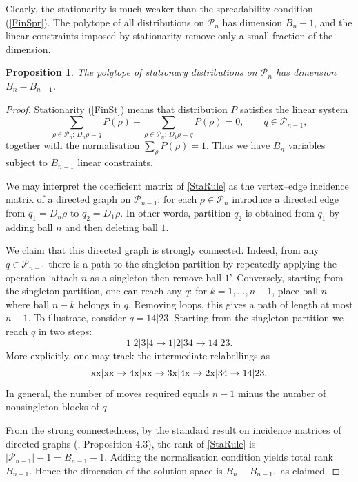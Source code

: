 \documentclass{article}
\newtheorem{proposition}{Proposition}
\begin{document}
Clearly, the stationarity is much weaker than the spreadability condition (\ref{FinSpr}).
The polytope of all distributions on $\mathcal P_n$ has dimension $B_n-1$, and the 
 linear constraints imposed by stationarity remove  only a small fraction of the dimension.



\begin{proposition}
The polytope of stationary distributions on $\mathcal P_n$ has dimension $B_n - B_{n-1}$.
\end{proposition}

\begin{proof}
Stationarity (\ref{FinSt}) means that  distribution $P$  satisfies the
linear system
\begin{equation}\label{StaRule}
\sum_{\rho\in \mathcal P_n:\,D_n \rho = q} P(\rho)
-
\sum_{\rho\in \mathcal P_n:\,D_1 \rho = q} P(\rho)
=0, 
\qquad q\in \mathcal P_{n-1},
\end{equation}
together with the normalisation $\sum_{\rho}P(\rho)=1$. Thus we have $B_n$ variables subject to $B_{n-1}$ linear constraints.

We may
interpret the coefficient matrix of \eqref{StaRule} as the vertex--edge incidence matrix of a directed graph on $\mathcal P_{n-1}$: for each $\rho\in\mathcal P_n$ introduce a directed edge from $q_1=D_n \rho$ to 
$q_2=D_1 \rho$. In other words, partition $q_2$ is obtained from $q_1$ by adding ball $n$ and then deleting ball $1$.

We claim that this directed graph is strongly connected. Indeed, from any $q\in\mathcal P_{n-1}$ there is a path to the singleton partition by repeatedly applying the operation `attach $n$ as a singleton
then remove ball $1$'. Conversely, starting from the singleton partition, one can reach any $q$: for $k=1,\dots,n-1$, place ball $n$ where ball $n-k$ belongs in $q$. Removing loops, this gives a path of length at most $n-1$. 
To illustrate, consider $q=14|23$. Starting from the singleton partition we reach $q$ in two steps:
\[
1|2|3|4 \to 1|2|34 \to 14|23.
\]
More explicitly, one may track the intermediate relabellings as
\[
{\rm xx}|{\rm xx}\to 4{\rm x}|{\rm xx}\to 3{\rm x}|4{\rm x}\to 2{\rm x}|34\to 14|23.
\]
In general, the number of moves required equals $n-1$ minus the number of nonsingleton blocks of $q$.




From the strong   connectedness, by the standard result on incidence matrices of directed graphs (\cite{Biggs}, Proposition 4.3), the rank of \eqref{StaRule} is $|\mathcal P_{n-1}|-1 = B_{n-1}-1$. Adding the normalisation condition yields total rank $B_{n-1}$.
Hence the dimension of the solution space is
$
B_n - B_{n-1},
$
as claimed.
\end{proof}
\end{document}
